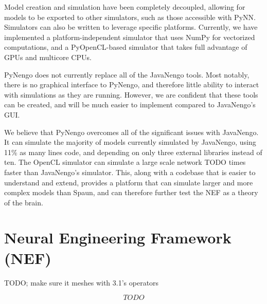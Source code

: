 \documentclass{frontiersSCNS}
\begin{document}
Model creation and simulation
have been completely decoupled,
allowing for models to be exported
to other simulators,
such as those accessible with PyNN.
Simulators can also be written
to leverage specific platforms.
Currently, we have implemented
a platform-independent simulator
that uses NumPy for vectorized computations,
and a PyOpenCL-based
simulator that takes full advantage of GPUs
and multicore CPUs.

PyNengo does not currently
replace all of the JavaNengo tools.
Most notably, there is no graphical interface
to PyNengo, and therefore little ability to interact
with simulations as they are running.
However, we are confident that these tools
can be created, and will be much easier
to implement compared to JavaNengo's GUI.

We believe that PyNengo overcomes
all of the significant issues
with JavaNengo.
It can simulate the majority of models
currently simulated by JavaNengo,
using 11\% as many lines code,
and depending on
only three external libraries instead of ten.
The OpenCL simulator can simulate
a large scale network TODO times
faster than JavaNengo's simulator.
This, along with a codebase
that is easier to understand and extend,
provides a platform
that can simulate larger and more complex
models than Spaun,
and can therefore further
test the NEF as a theory of the brain.

\section{Neural Engineering Framework (NEF)}

TODO; make sure it meshes with 3.1's operators

\begin{equation} \label{TODO}
  TODO
\end{equation}
\end{document}
